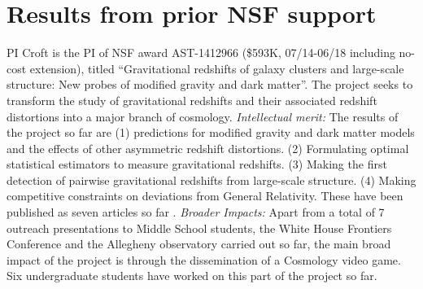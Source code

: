 \section{Results from prior NSF support}

PI Croft is the PI of NSF award AST-1412966 (\$593K, 07/14-06/18
including no-cost extension), titled ``Gravitational redshifts of
galaxy clusters and large-scale structure: New probes of modified
gravity and dark matter''.  The project seeks to transform the study
of gravitational redshifts and their associated redshift distortions
into a major branch of cosmology.  {\it Intellectual merit:} The
results of the project so far are (1) predictions
for modified gravity and dark matter models and the effects of other
asymmetric redshift distortions.  (2) Formulating optimal statistical
estimators to measure gravitational redshifts.  (3) Making the 
first detection of
pairwise gravitational redshifts from large-scale structure. (4)
Making competitive constraints on deviations from General Relativity.
 These have been published as seven articles so far
\citep{2015MNRAS.453.1754A,2017MNRAS.471.2345Z,2017MNRAS.471.2077A,2017MNRAS.470.2822A,2017arXiv170907854G,2017MNRAS.465.4853A,2016MNRAS.456.3743A}. {\it
  Broader Impacts:} Apart from a total of 7 outreach presentations to
Middle School students, the White House Frontiers Conference and the
Allegheny observatory carried out so far, the main broad impact of the
project is through the dissemination of a Cosmology video
game. Six undergraduate students have worked on this part of the
project so far.


